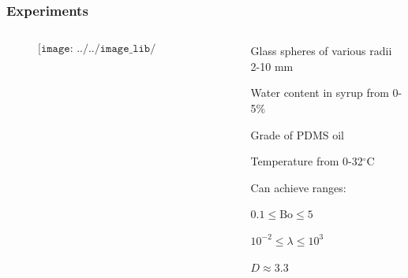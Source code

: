 \documentclass{beamer}
\begin{document}

\begin{frame}
  \frametitle{Experiments}

  \begin{columns}

    \begin{column}{0.5\paperwidth}
      \vspace{-1cm}

      \begin{figure}
        $$\texttt{[image: ../../image\_lib/tank\_labelled.png]}$$
      \end{figure}

    \end{column}

    \begin{column}{0.5\paperwidth}
      \centering

      Glass spheres of various radii 2-10 mm \\

      \vspace{0.5cm}

      Water content in syrup from 0-5\% \\

      \vspace{0.5cm}

      Grade of PDMS oil \\

      \vspace{0.5cm}

      Temperature from 0-32$^{\circ}$C \\

      \vspace{1cm}

      Can achieve ranges: \\

      \vspace{0.5cm}

      $0.1 \leq \text{Bo} \leq 5$ \\

      \vspace{0.5cm}

      $10^{-2} \leq \lambda \leq 10^{3}$ \\
 
      \vspace{0.5cm}

      $D \approx 3.3$ \\
    \end{column}

  \end{columns}
\end{frame}

\end{document}
